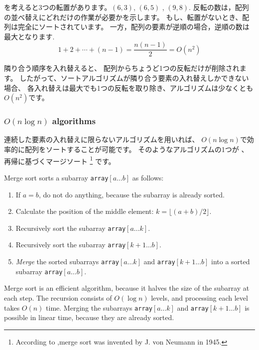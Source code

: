 \begin{center}
\end{center}
を考えると3つの転置があります。$(6,3)$, $(6,5)$ , $(9,8)$.
反転の数は，配列の並べ替えにどれだけの作業が必要かを示します。
もし、転置がないとき、配列は完全にソートされています。
一方，配列の要素が逆順の場合，逆順の数は最大となります.
\[1+2+\cdots+(n-1)=\frac{n(n-1)}{2} = O(n^2)\]


隣り合う順序を入れ替えると、
配列からちょうど1つの反転だけが削除されます。
したがって、ソートアルゴリズムが隣り合う要素の入れ替えしかできない場合、
各入れ替えは最大でも1つの反転を取り除き、アルゴリズムは少なくとも$O(n^2)$です。

\subsubsection{$O(n \log n)$ algorithms}


連続した要素の入れ替えに限らないアルゴリズムを用いれば、
$O(n \log n)$で効率的に配列をソートすることが可能です。
そのようなアルゴリズムの1つが 、再帰に基づくマージソート
\footnote{According to \cite{knu983},merge sort was invented by J. von Neumann in 1945.}
です。

Merge sort sorts a subarray \texttt{array}$[a \ldots b]$ as follows:

\begin{enumerate}
\item If $a=b$, do not do anything, because the subarray is already sorted.
\item Calculate the position of the middle element: $k=\lfloor (a+b)/2 \rfloor$.
\item Recursively sort the subarray \texttt{array}$[a \ldots k]$.
\item Recursively sort the subarray \texttt{array}$[k+1 \ldots b]$.
\item \emph{Merge} the sorted subarrays \texttt{array}$[a \ldots k]$ and
\texttt{array}$[k+1 \ldots b]$
into a sorted subarray \texttt{array}$[a \ldots b]$.
\end{enumerate}

Merge sort is an efficient algorithm, because it
halves the size of the subarray at each step.
The recursion consists of $O(\log n)$ levels,
and processing each level takes $O(n)$ time.
Merging the subarrays \texttt{array}$[a \ldots k]$ and \texttt{array}$[k+1 \ldots b]$
is possible in linear time, because they are already sorted.

